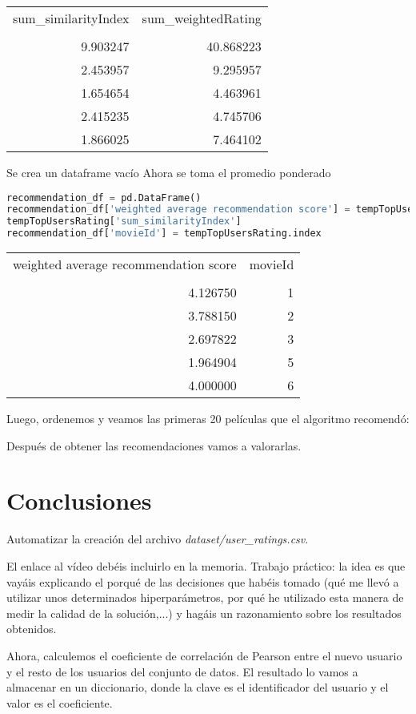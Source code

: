 \documentclass{uimppracticas}
\begin{document}
\begin{tabular}{rr}
	\toprule
	sum\_similarityIndex &  sum\_weightedRating \\
	&                     \\
	\midrule
	9.903247 &           40.868223 \\
	2.453957 &            9.295957 \\
	1.654654 &            4.463961 \\
	2.415235 &            4.745706 \\
	1.866025 &            7.464102 \\
	\bottomrule
\end{tabular}

Se crea un dataframe vacío
Ahora se toma el promedio ponderado

\begin{lstlisting}[language=python]
recommendation_df = pd.DataFrame()
recommendation_df['weighted average recommendation score'] = tempTopUsersRating['sum_weightedRating'] / \
tempTopUsersRating['sum_similarityIndex']
recommendation_df['movieId'] = tempTopUsersRating.index
\end{lstlisting}

\begin{tabular}{rr}
	\toprule
	weighted average recommendation score &  movieId \\
	&          \\
	\midrule
	4.126750 &        1 \\
	3.788150 &        2 \\
	2.697822 &        3 \\
	1.964904 &        5 \\
	4.000000 &        6 \\
	\bottomrule
\end{tabular}


Luego, ordenemos y veamos las primeras 20 películas que el algoritmo recomendó:




Después de obtener las recomendaciones vamos a valorarlas. 

\newpage

\section{Conclusiones}

Automatizar la creación del archivo \textit{dataset/user\_ratings.csv}.

El enlace al vídeo debéis incluirlo en la memoria. Trabajo práctico: la idea es que vayáis explicando el porqué de las decisiones que habéis tomado (qué me llevó a utilizar unos determinados hiperparámetros, por qué he utilizado esta manera de medir la calidad de la solución,...) y hagáis un razonamiento sobre los resultados obtenidos.

Ahora, calculemos el coeficiente de correlación de Pearson entre el nuevo usuario y el resto de los usuarios del conjunto de datos. El resultado lo vamos a almacenar en un diccionario, donde la clave es el identificador del usuario y el valor es el coeficiente.


\newpage

\renewcommand{\refname}{Bibliografía}


	
\end{document}
